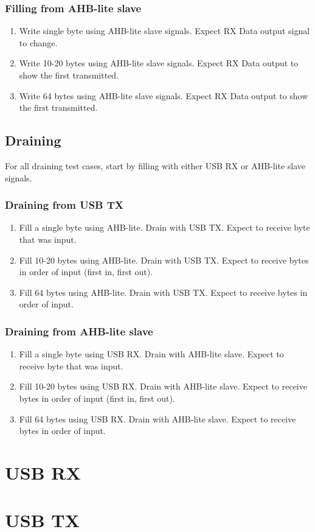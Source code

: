 \documentclass{scrartcl}
\begin{document}
\subsubsection{Filling from AHB-lite slave}
\begin{enumerate}
    \item Write single byte using AHB-lite slave signals. Expect RX Data output signal to change.
    \item Write 10-20 bytes using AHB-lite slave signals. Expect RX Data output to show the first transmitted.
    \item Write 64 bytes using AHB-lite slave signals. Expect RX Data output to show the first transmitted.
\end{enumerate}

\subsection{Draining}
For all draining test cases, start by filling with either USB RX or AHB-lite slave signals.

\subsubsection{Draining from USB TX}
\begin{enumerate}
    \item Fill a single byte using AHB-lite. Drain with USB TX. Expect to receive byte that was input.
    \item Fill 10-20 bytes using AHB-lite. Drain with USB TX. Expect to receive bytes in order of input (first in, first out).
    \item Fill 64 bytes using AHB-lite. Drain with USB TX. Expect to receive bytes in order of input.
\end{enumerate}

\subsubsection{Draining from AHB-lite slave}
\begin{enumerate}
    \item Fill a single byte using USB RX. Drain with AHB-lite slave. Expect to receive byte that was input.
    \item Fill 10-20 bytes using USB RX. Drain with AHB-lite slave. Expect to receive bytes in order of input (first in, first out).
    \item Fill 64 bytes using USB RX. Drain with AHB-lite slave. Expect to receive bytes in order of input.
\end{enumerate}

\section{USB RX}

\section{USB TX}
\end{document}

